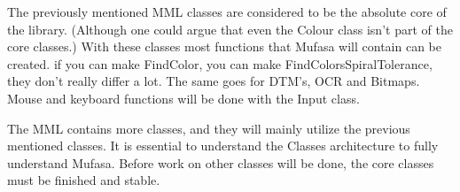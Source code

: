 \documentclass[a4paper, 10pt]{article}
\begin{document}
The previously mentioned MML classes are considered to be the absolute core of the library. (Although one could argue that even the Colour class isn't part of the core classes.)
With these classes most functions that Mufasa will contain can be created. if you can make FindColor, you can make FindColorsSpiralTolerance, they don't really differ a lot. The same goes for DTM's, OCR and Bitmaps. Mouse and keyboard functions will be done with the Input class.

The MML contains more classes, and they will mainly utilize the previous mentioned classes.
It is essential to understand the Classes architecture to fully understand Mufasa.
Before work on other classes will be done, the core classes must be finished and stable.
\end{document}
